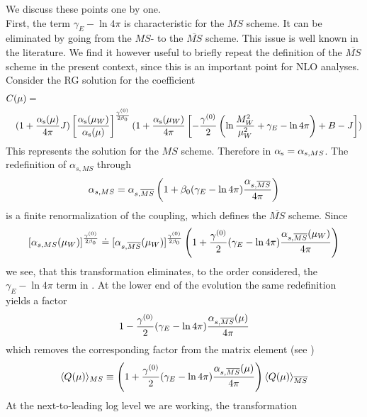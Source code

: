 We discuss these points one by one.\\
First, the term $\gamma_E-\ln 4\pi$ is characteristic for the $MS$
scheme. It can be eliminated by going from the $MS$- to the
$\overline{MS}$ scheme. This issue is well known in the literature.  We
find it however useful to briefly repeat the definition of the
$\overline{MS}$ scheme in the present context, since this is an
important point for NLO analyses.
\\
Consider the RG solution for the coefficient
\begin{eqnarray}\label{cja2}
 \lefteqn{C(\mu)=} & & \\
 & &(1+{\as(\mu)\over 4\pi}J)\left[{\as(\mu_W)\over \as(\mu)}\right]^{
  \gamma^{(0)}\over 2\beta_0}
 (1+{\as(\mu_W)\over 4\pi}\left[-{\gamma^{(0)}\over 2}
 \left(\ln{M^2_W\over\mu^2_W}+\gamma_E-\ln 4\pi\right)+B-J\right])
 \nonumber
\end{eqnarray}
This represents the solution for the $MS$ scheme. Therefore in
 $\alpha_{\rm s}=\alpha_{s,MS}$. The redefinition of $\alpha_{s,MS}$
through
\begin{equation}\label{amsb}
\alpha_{s,MS}=\alpha_{s,\overline{MS}}\left(1+\beta_0(\gamma_E-\ln 4\pi)
 {\alpha_{s,\overline{MS}}\over 4\pi}\right)  \end{equation}
is a finite renormalization of the coupling,
which defines the $\overline{MS}$ scheme. Since
\begin{equation}\label{msbr}
[\alpha_{s,MS}(\mu_W)]^{\gamma^{(0)}\over 2\beta_0}\doteq
[\alpha_{s,\overline{MS}}(\mu_W)]^{\gamma^{(0)}\over 2\beta_0}
\left(1+{\gamma^{(0)}\over 2}(\gamma_E-\ln 4\pi)
{\alpha_{s,\overline{MS}}(\mu_W)\over 4\pi}\right)   \end{equation}
we see, that this transformation eliminates, to the order considered,
the $\gamma_E-\ln 4\pi$ term in . At the lower end of the
evolution the same redefinition yields a factor
\begin{equation}\label{msbf}
1-{\gamma^{(0)}\over 2}(\gamma_E-\ln 4\pi)
{\alpha_{s,\overline{MS}}(\mu)\over 4\pi}   \end{equation}
which removes the corresponding factor from the matrix element
(see )
\begin{equation}\label{msbq}
\langle Q(\mu)\rangle_{MS}\equiv
\left(1+{\gamma^{(0)}\over 2}(\gamma_E-\ln 4\pi)
{\alpha_{s,\overline{MS}}(\mu)\over 4\pi}\right)
\langle Q(\mu)\rangle_{\overline{MS}}   \end{equation}
At the next-to-leading log level we are working, the transformation
